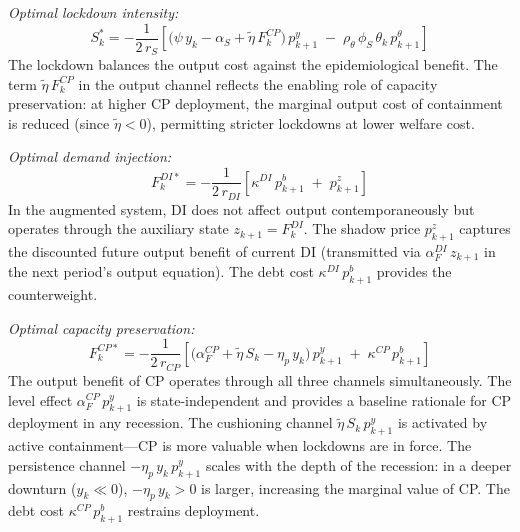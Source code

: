 \documentclass[12pt, a4paper]{article}
\begin{document}
\medskip
\noindent\textit{Optimal lockdown intensity:}
%
\begin{equation}
    S_k^* = -\frac{1}{2\, r_S}\left[
    \bigl(\psi\, y_k - \alpha_S + \tilde{\eta}\, F_k^{CP}\bigr)\, p_{k+1}^y
    \;-\; \rho_\theta\,\phi_S\,\theta_k\, p_{k+1}^\theta
    \right]
    \label{eq:opt_S_corr}
\end{equation}
%
The lockdown balances the output cost against the epidemiological benefit. The
term $\tilde{\eta}\, F_k^{CP}$ in the output channel reflects the enabling
role of capacity preservation: at higher CP deployment, the marginal output
cost of containment is reduced (since $\tilde{\eta} < 0$), permitting stricter
lockdowns at lower welfare cost.

\medskip
\noindent\textit{Optimal demand injection:}
%
\begin{equation}
    F_k^{DI*} = -\frac{1}{2\, r_{DI}}\left[
    \kappa^{DI}\, p_{k+1}^b
    \;+\; p_{k+1}^z
    \right]
    \label{eq:opt_DI_corr}
\end{equation}
%
In the augmented system, DI does not affect output contemporaneously but
operates through the auxiliary state $z_{k+1} = F_k^{DI}$. The shadow price
$p_{k+1}^z$ captures the discounted future output benefit of current DI
(transmitted via $\alpha_F^{DI}\, z_{k+1}$ in the next period's output
equation). The debt cost $\kappa^{DI}\, p_{k+1}^b$ provides the counterweight.

\medskip
\noindent\textit{Optimal capacity preservation:}
%
\begin{equation}
    F_k^{CP*} = -\frac{1}{2\, r_{CP}}\left[
    \bigl(\alpha_F^{CP} + \tilde{\eta}\, S_k - \eta_p\, y_k\bigr)\, p_{k+1}^y
    \;+\; \kappa^{CP}\, p_{k+1}^b
    \right]
    \label{eq:opt_CP_corr}
\end{equation}
%
The output benefit of CP operates through all three channels simultaneously.
The level effect $\alpha_F^{CP}\, p_{k+1}^y$ is state-independent and provides
a baseline rationale for CP deployment in any recession. The cushioning channel
$\tilde{\eta}\, S_k\, p_{k+1}^y$ is activated by active containment---CP is
more valuable when lockdowns are in force. The persistence channel
$-\eta_p\, y_k\, p_{k+1}^y$ scales with the depth of the recession: in a
deeper downturn ($y_k \ll 0$), $-\eta_p\, y_k > 0$ is larger, increasing the
marginal value of CP. The debt cost $\kappa^{CP}\, p_{k+1}^b$ restrains
deployment.
\end{document}
